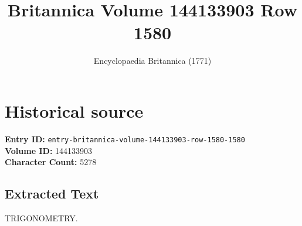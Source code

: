 \documentclass{article}
\title{Britannica Volume 144133903 Row 1580}
\date{Encyclopaedia Britannica (1771)}
\begin{document}
\maketitle

\section*{Historical source}
\textbf{Entry ID:} \texttt{entry-britannica-volume-144133903-row-1580-1580} \\
\textbf{Volume ID:} 144133903 \\
\textbf{Character Count:} 5278

\subsection*{Extracted Text}
TRIGONOMETRY.
\end{document}

